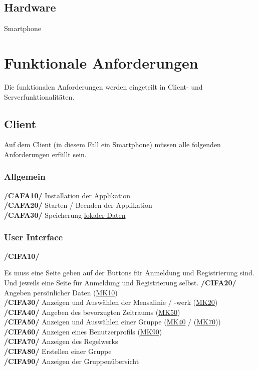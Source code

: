 \documentclass[a4paper]{scrreprt}
\begin{document}
\section{Hardware}
Smartphone 
 
\chapter{Funktionale Anforderungen}
Die funktionalen Anforderungen werden eingeteilt in Client- und Serverfunktionalitäten.

\section{Client}
Auf dem Client (in diesem Fall ein Smartphone) müssen alle folgenden Anforderungen erfüllt sein. 

\subsection{Allgemein}

\begin{addmargin}[25pt]{0pt} 
\textbf{/CAFA10/} Installation der Applikation \\
\textbf{/CAFA20/} Starten / Beenden der Applikation\\
\textbf{/CAFA30/} Speicherung \hyperlink{label4}{lokaler Daten}\\
\end{addmargin}

\subsection{User Interface}

\begin{addmargin}[25pt]{0pt} 
\hypertarget{cifa10}{\textbf{/CIFA10/}} Es muss eine Seite geben auf der Buttons für Anmeldung und Registrierung sind. Und jeweils eine Seite für Anmeldung und Registrierung selbst.
\hypertarget{cifa20}{\textbf{/CIFA20/}} Angeben persönlicher Daten (\hyperlink{mk10}{MK10})\\
\hypertarget{cifa30}{\textbf{/CIFA30/}} Anzeigen und Auswählen der Mensalinie / -werk (\hyperlink{mk20}{MK20})\\
\hypertarget{cifa40}{\textbf{/CIFA40/}} Angeben des bevorzugten Zeitraums (\hyperlink{mk50}{MK50})\\
\hypertarget{cifa50}{\textbf{/CIFA50/}} Anzeigen und Auswählen einer Gruppe (\hyperlink{m40}{MK40} / (\hyperlink{mk70}{MK70}))\\
\hypertarget{cifa60}{\textbf{/CIFA60/}} Anzeigen eines Benutzerprofils (\hyperlink{mk90}{MK90})\\
\hypertarget{cifa70}{\textbf{/CIFA70/}} Anzeigen des Regelwerks\\
\hypertarget{cifa80}{\textbf{/CIFA80/}} Erstellen einer Gruppe\\
\hypertarget{cifa90}{\textbf{/CIFA90/}} Anzeigen der Gruppenübersicht\\
\end{addmargin}
\end{document}
